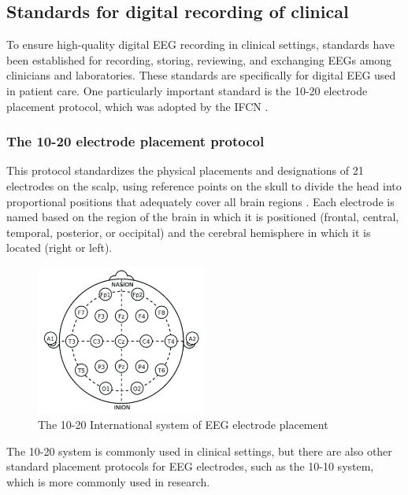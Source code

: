 \subsection{Standards for digital recording of clinical }
To ensure high-quality digital \gls{EEG} recording in clinical settings, standards have been established for recording, storing, reviewing, and exchanging \glspl{EEG} among clinicians and laboratories. These standards are specifically for digital EEG used in patient care. One particularly important standard is the 10-20 electrode placement protocol, which was adopted by the \gls{IFCN} \cite{nuwer_ifcn_1998}.

\subsubsection{The 10-20 electrode placement protocol}
This protocol standardizes the physical placements and designations of 21 electrodes on the scalp, using reference points on the skull to divide the head into proportional positions that adequately cover all brain regions \cite{rojas_study_2018}. Each electrode is named based on the region of the brain in which it is positioned (frontal, central, temporal, posterior, or occipital) and the cerebral hemisphere in which it is located (right or left).

\begin{figure}[ht]
    \centering
    \includegraphics[width=0.5\textwidth]{images/Th-background/10-20-electrode-placement.png}
    \caption{The 10-20 International system of EEG electrode placement \cite{rojas_study_2018}}
    \label{fig:10-20-electrode-placement}
\end{figure}

The 10-20 system is commonly used in clinical settings, but there are also other standard placement protocols for EEG electrodes, such as the 10-10 system, which is more commonly used in research.

